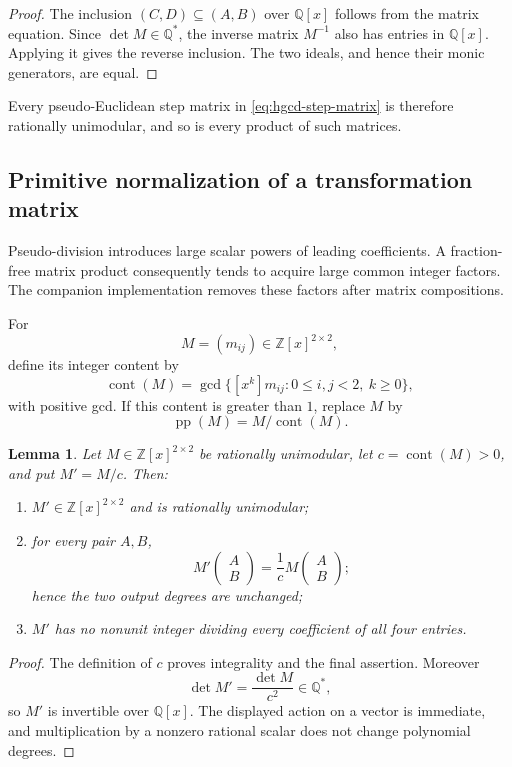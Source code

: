 \documentclass[11pt]{book}
\newtheorem{lemma}[theorem]{Lemma}
\theoremstyle{definition}
\newcommand{\ZZ}{\mathbb Z}
\begin{document}
\begin{proof}
The inclusion $(C,D)\subseteq(A,B)$ over $\mathbb Q[x]$ follows from the
matrix equation.  Since $\det M\in\mathbb Q^*$, the inverse matrix
$M^{-1}$ also has entries in $\mathbb Q[x]$.  Applying it gives the reverse
inclusion.  The two ideals, and hence their monic generators, are equal.
\end{proof}

Every pseudo-Euclidean step matrix in \eqref{eq:hgcd-step-matrix} is therefore
rationally unimodular, and so is every product of such matrices.

\subsection{Primitive normalization of a transformation matrix}

Pseudo-division introduces large scalar powers of leading coefficients.  A
fraction-free matrix product consequently tends to acquire large common
integer factors.  The companion implementation removes these factors after
matrix compositions.

For
\[
 M=(m_{ij})\in\ZZ[x]^{2\times2},
\]
define its integer content by
\[
 \operatorname{cont}(M)
 =\gcd\{[x^k]m_{ij}:0\le i,j<2,\ k\ge0\},
\]
with positive gcd.  If this content is greater than $1$, replace $M$ by
\[
 \operatorname{pp}(M)=M/\operatorname{cont}(M).
\]

\begin{lemma}\label{lem:hgcd-matrix-content}
Let $M\in\ZZ[x]^{2\times2}$ be rationally unimodular, let
$c=\operatorname{cont}(M)>0$, and put $M'=M/c$.  Then:
\begin{enumerate}
 \item $M'\in\ZZ[x]^{2\times2}$ and is rationally unimodular;
 \item for every pair $A,B$,
 \[
  M'\begin{pmatrix}A\\B\end{pmatrix}
  =\frac1c
   M\begin{pmatrix}A\\B\end{pmatrix};
 \]
 hence the two output degrees are unchanged;
 \item $M'$ has no nonunit integer dividing every coefficient of all four
 entries.
\end{enumerate}
\end{lemma}

\begin{proof}
The definition of $c$ proves integrality and the final assertion.  Moreover
\[
 \det M'=\frac{\det M}{c^2}\in\mathbb Q^*,
\]
so $M'$ is invertible over $\mathbb Q[x]$.  The displayed action on a vector
is immediate, and multiplication by a nonzero rational scalar does not change
polynomial degrees.
\end{proof}
\end{document}
